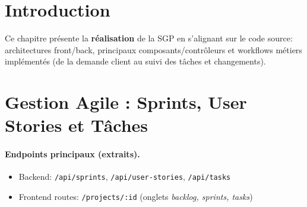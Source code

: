 
\section{Introduction}
\label{sec:chap3_intro}

Ce chapitre présente la \textbf{réalisation} de la SGP en s’alignant sur le code source: architectures front/back, principaux composants/contrôleurs et workflows métiers implémentés (de la demande client au suivi des tâches et changements).


\section{Gestion Agile : Sprints, User Stories et Tâches}
\paragraph{Endpoints principaux (extraits).}
\begin{itemize}
  \item Backend: \texttt{/api/sprints}, \texttt{/api/user-stories}, \texttt{/api/tasks}
  \item Frontend routes: \texttt{/projects/:id} (onglets \textit{backlog, sprints, tasks})
\end{itemize}

